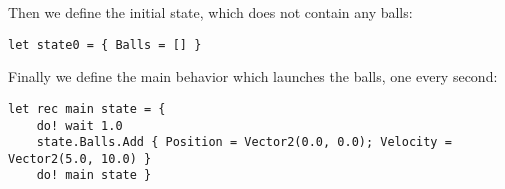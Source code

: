 Then we define the initial state, which does not contain any balls:
\begin{lstlisting}
let state0 = { Balls = [] }
\end{lstlisting}

Finally we define the main behavior which launches the balls, one every second:
\begin{lstlisting}
let rec main state = {
    do! wait 1.0
    state.Balls.Add { Position = Vector2(0.0, 0.0); Velocity = Vector2(5.0, 10.0) }
    do! main state }
\end{lstlisting}
